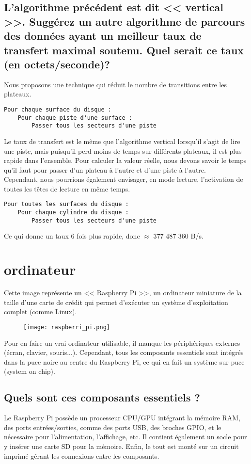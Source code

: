 \documentclass[10pt,letterpaper]{article}
\renewcommand{\thesubsection}{\arabic{subsection}.}
\begin{document}
\subsection{L'algorithme précédent est dit << vertical >>. Suggérez un autre algorithme de parcours des données ayant un meilleur taux de transfert maximal soutenu. Quel serait ce taux (en octets/seconde)?}
Nous proposons une technique qui réduit le nombre de transitions entre les plateaux.
\begin{verbatim}
Pour chaque surface du disque :
    Pour chaque piste d'une surface :
        Passer tous les secteurs d'une piste
\end{verbatim}
Le taux de transfert est le même que l'algorithme vertical lorsqu'il s'agit de lire une piste, mais puisqu'il perd moins de temps sur différents plateaux, il est plus rapide dans l'ensemble. Pour calculer la valeur réelle, nous devons savoir le temps qu'il faut pour passer d'un plateau à l'autre et d'une piste à l'autre. \\
Cependant, nous pourrions également envisager, en mode lecture, l'activation de toutes les têtes de lecture en même temps.
\begin{verbatim}
Pour toutes les surfaces du disque :
    Pour chaque cylindre du disque :
        Passer tous les secteurs d'une piste
\end{verbatim}
Ce qui donne un taux 6 fois plus rapide, donc $\approx$ 377 487 360 B/s.

\newpage
\section{ordinateur}
\renewcommand{\thesubsection}{\alph{subsection}.}
Cette image représente un << Raspberry Pi >>, un ordinateur miniature de la taille d'une carte de crédit qui permet d'exécuter un système d'exploitation complet (comme Linux).

\begin{figure}[h]
\centering
\texttt{[image: raspberri\_pi.png]}
\end{figure}

Pour en faire un vrai ordinateur utilisable, il manque les périphériques externes (écran, clavier, souris...). Cependant, tous les composants essentiels sont intégrés dans la puce noire au centre du Raspberry Pi, ce qui en fait un système sur puce (system on chip).
\bigskip

\subsection{Quels sont ces composants essentiels ?}
Le Raspberry Pi possède un processeur CPU/GPU intégrant la mémoire RAM, des ports entrées/sorties, comme des ports USB, des broches GPIO, et le nécessaire pour l'alimentation, l'affichage, etc. Il contient également un socle pour y insérer une carte SD pour la mémoire. Enfin, le tout est monté sur un circuit imprimé gérant les connexions entre les composants.
\bigskip
\end{document}

